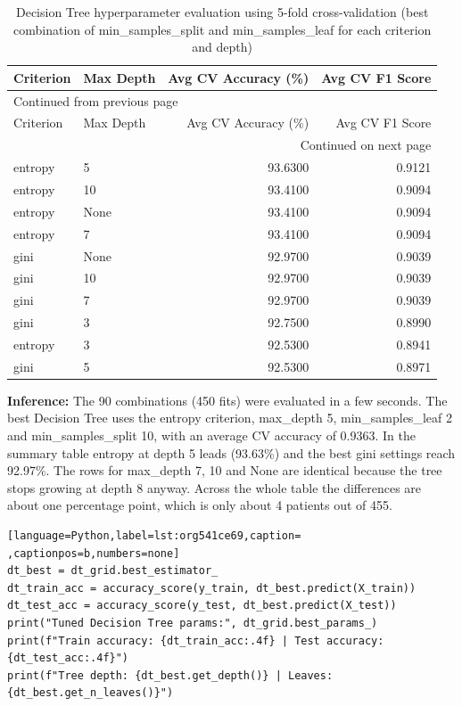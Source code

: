 \documentclass[11pt]{article}
\begin{document}
\begin{longtable}{|l|l|r|r|}
\caption{Decision Tree hyperparameter evaluation using 5-fold cross-validation (best combination of min\_samples\_split and min\_samples\_leaf for each criterion and depth)}
\\[0pt]
\hline
Criterion & Max Depth & Avg CV Accuracy (\%) & Avg CV F1 Score\\[0pt]
\hline
\endfirsthead
\multicolumn{4}{l}{Continued from previous page} \\[0pt]
\hline

Criterion & Max Depth & Avg CV Accuracy (\%) & Avg CV F1 Score \\[0pt]

\hline
\endhead
\hline\multicolumn{4}{r}{Continued on next page} \\
\endfoot
\endlastfoot
\hline
entropy & 5 & 93.6300 & 0.9121\\[0pt]
\hline
entropy & 10 & 93.4100 & 0.9094\\[0pt]
\hline
entropy & None & 93.4100 & 0.9094\\[0pt]
\hline
entropy & 7 & 93.4100 & 0.9094\\[0pt]
\hline
gini & None & 92.9700 & 0.9039\\[0pt]
\hline
gini & 10 & 92.9700 & 0.9039\\[0pt]
\hline
gini & 7 & 92.9700 & 0.9039\\[0pt]
\hline
gini & 3 & 92.7500 & 0.8990\\[0pt]
\hline
entropy & 3 & 92.5300 & 0.8941\\[0pt]
\hline
gini & 5 & 92.5300 & 0.8971\\[0pt]
\hline
\end{longtable}

\textbf{Inference:} The 90 combinations (450 fits) were evaluated in a few seconds. The best Decision Tree uses
the entropy criterion, max\_depth 5, min\_samples\_leaf 2 and min\_samples\_split 10, with an
average CV accuracy of 0.9363. In the summary table entropy at depth 5 leads (93.63\%) and
the best gini settings reach 92.97\%. The rows for max\_depth 7, 10 and None are identical
because the tree stops growing at depth 8 anyway. Across the whole table the differences are
about one percentage point, which is only about 4 patients out of 455.
\begin{lstlisting}[language=Python,label=lst:org541ce69,caption= ,captionpos=b,numbers=none]
dt_best = dt_grid.best_estimator_
dt_train_acc = accuracy_score(y_train, dt_best.predict(X_train))
dt_test_acc = accuracy_score(y_test, dt_best.predict(X_test))
print("Tuned Decision Tree params:", dt_grid.best_params_)
print(f"Train accuracy: {dt_train_acc:.4f} | Test accuracy: {dt_test_acc:.4f}")
print(f"Tree depth: {dt_best.get_depth()} | Leaves: {dt_best.get_n_leaves()}")
\end{lstlisting}
\end{document}
